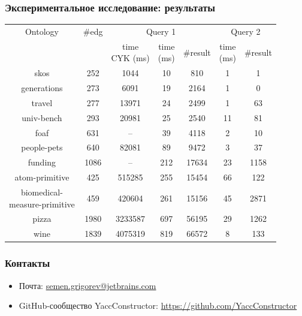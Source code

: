 \documentclass{beamer}
\begin{document}
\begin{frame}[fragile]
\transwipe[direction=90]
\frametitle{Экспериментальное исследование: результаты}
\centering
\begin{tabular}{ | c | c | c | c | c | c | c |}
\hline
Ontology & \#edg & \multicolumn{3}{|c|}{Query 1} & \multicolumn{2}{|c|}{Query 2} \\
\cline{3-7}
& & \shortstack{time \\ CYK (ms)} & \shortstack{time \\ (ms)} & \#result & \shortstack{time \\ (ms)} & \#result \\
\hline 
\hline
skos        & 252  & 1044  & 10 & 810 & 1 & 1 \\
generations & 273  & 6091  & 19 & 2164 & 1 & 0 \\
travel      & 277  & 13971 & 24 & 2499 & 1 & 63 \\
univ-bench  & 293  & 20981 & 25 & 2540 & 11 & 81 \\
foaf        & 631  & --    & 39 & 4118 & 2 & 10 \\
people-pets & 640  & 82081 & 89 & 9472 & 3 & 37 \\
funding     & 1086 & --    & 212 & 17634 & 23 & 1158 \\
atom-primitive & 425 & 515285 & 255 & 15454 & 66 & 122 \\
\shortstack{biomedical- \\ measure-primitive} & 459 & 420604 & 261 & 15156 & 45 & 2871 \\
pizza       & 1980 & 3233587 & 697 & 56195 & 29 & 1262 \\
wine        & 1839 & 4075319 & 819 & 66572 & 8 & 133 \\
\hline
\end{tabular}

\end{frame}
            
\begin{frame}
\transwipe[direction=90]
\frametitle{Контакты}
\begin{itemize}
  \item Почта: \url{semen.grigorev@jetbrains.com}
  \item GitHub-сообщество YaccConstructor: \url{https://github.com/YaccConstructor}
\end{itemize}
\end{frame}
\end{document}

